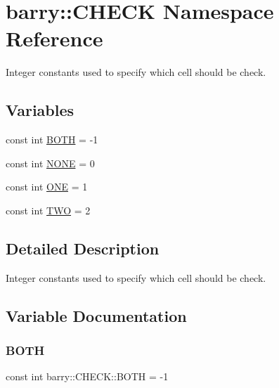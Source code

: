\hypertarget{namespacebarry_1_1_c_h_e_c_k}{}\section{barry\+:\+:C\+H\+E\+CK Namespace Reference}
\label{namespacebarry_1_1_c_h_e_c_k}


Integer constants used to specify which cell should be check.  


\subsection*{Variables}
\begin{DoxyCompactItemize}
\item 
const int \hyperlink{namespacebarry_1_1_c_h_e_c_k_a604b0ef801ff768bd8561362cef579b2}{B\+O\+TH} = -\/1
\item 
const int \hyperlink{namespacebarry_1_1_c_h_e_c_k_aa64c84acf4e28b6cb1243ccda1eec41c}{N\+O\+NE} = 0
\item 
const int \hyperlink{namespacebarry_1_1_c_h_e_c_k_add50baad3a196b1979efbbf9e6c86913}{O\+NE} = 1
\item 
const int \hyperlink{namespacebarry_1_1_c_h_e_c_k_a6aa56c3d8a8260d90867278d21ace4d2}{T\+WO} = 2
\end{DoxyCompactItemize}


\subsection{Detailed Description}
Integer constants used to specify which cell should be check. 

\subsection{Variable Documentation}
\mbox{\label{namespacebarry_1_1_c_h_e_c_k_a604b0ef801ff768bd8561362cef579b2}} 
\subsubsection{\texorpdfstring{B\+O\+TH}{BOTH}}
{\footnotesize\ttfamily const int barry\+::\+C\+H\+E\+C\+K\+::\+B\+O\+TH = -\/1}




